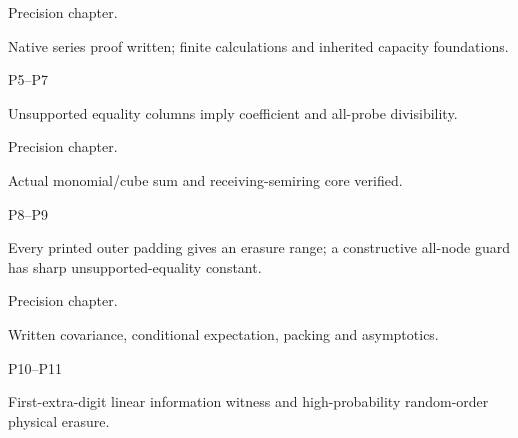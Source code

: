 \documentclass[11pt,a4paper]{article}
\newlength{\OfflineResearchTableWidth}
\newcommand{\OfflineResearchRow}{\par}
\newenvironment{OfflineResearchTable}{%
  \par\medskip\begingroup\small\setlength{\parindent}{0pt}%
  \setlength{\parskip}{3pt plus 1pt minus .5pt}%
  \setlength{\OfflineResearchTableWidth}{\linewidth}%
}{%
  \par\endgroup\medskip%
}
\begin{document}
\begin{OfflineResearchTable}
\begin{minipage}[t]{0.29295\OfflineResearchTableWidth}
Precision chapter.
\end{minipage}\hfill%
\begin{minipage}[t]{0.31185\OfflineResearchTableWidth}\raggedright
Native series proof
written; finite calculations and inherited capacity foundations.
\end{minipage}%
\OfflineResearchRow
\noindent%
\begin{minipage}[t]{0.06615\OfflineResearchTableWidth}\raggedright
P5--P7
\end{minipage}\hfill%
\begin{minipage}[t]{0.27405\OfflineResearchTableWidth}\raggedright
Unsupported equality columns imply coefficient and all-probe
divisibility.
\end{minipage}\hfill%
\begin{minipage}[t]{0.29295\OfflineResearchTableWidth}\raggedright
Precision chapter.
\end{minipage}\hfill%
\begin{minipage}[t]{0.31185\OfflineResearchTableWidth}\raggedright
Actual monomial/cube sum and
receiving-semiring core verified.
\end{minipage}%
\OfflineResearchRow
\noindent%
\begin{minipage}[t]{0.06615\OfflineResearchTableWidth}\raggedright
P8--P9
\end{minipage}\hfill%
\begin{minipage}[t]{0.27405\OfflineResearchTableWidth}\raggedright
Every printed outer padding gives an erasure range; a
constructive all-node guard has sharp unsupported-equality constant.
\end{minipage}\hfill%
\begin{minipage}[t]{0.29295\OfflineResearchTableWidth}\raggedright
Precision chapter.
\end{minipage}\hfill%
\begin{minipage}[t]{0.31185\OfflineResearchTableWidth}\raggedright
Written covariance, conditional expectation,
packing and asymptotics.
\end{minipage}%
\OfflineResearchRow
\noindent%
\begin{minipage}[t]{0.06615\OfflineResearchTableWidth}\raggedright
P10--P11
\end{minipage}\hfill%
\begin{minipage}[t]{0.27405\OfflineResearchTableWidth}\raggedright
First-extra-digit linear information witness and
high-probability random-order physical erasure.
\end{minipage}\hfill%
\begin{minipage}[t]{0.29295\OfflineResearchTableWidth}\raggedright

\end{minipage}
\end{OfflineResearchTable}
\end{document}
